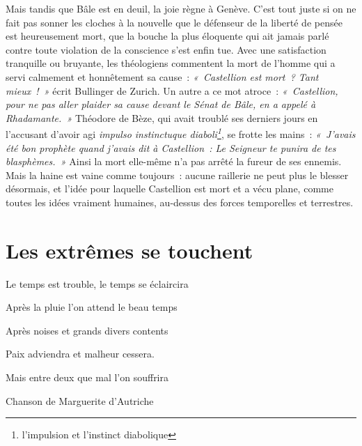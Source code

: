 \documentclass[french,twoside]{book} %
\newcommand\foreign[1]{\emph{#1}}
\newcommand{\bibl}[1]{{\smallskip\RaggedLeft\normalsize\normalfont #1\par\medskip}}
\newcommand{\spl}[1]{\noindent\hangindent=2\parindent  #1\par} %
\newenvironment{epigraph}{\begin{addmargin}[2\parindent]{0em}\sffamily\large\setstretch{0.95}}{\end{addmargin}\bigskip}
\newcommand\chapteropen{} %
\newcommand\chapterclose{} %
\begin{document}
\noindent Mais tandis que Bâle est en deuil, la joie règne à Genève. C’est tout juste si on ne fait pas sonner les cloches à la nouvelle que le défenseur de la liberté de pensée est heureusement mort, que la bouche la plus éloquente qui ait jamais parlé contre toute violation de la conscience s’est enfin tue. Avec une satisfaction tranquille ou bruyante, les théologiens commentent la mort de l’homme qui a servi calmement et honnêtement sa cause : \emph{« Castellion est mort ? Tant mieux ! »} écrit Bullinger de Zurich. Un autre a ce mot atroce : \emph{« Castellion, pour ne pas aller plaider sa cause devant le Sénat de Bâle, en a appelé à Rhadamante. »} Théodore de Bèze, qui avait troublé ses derniers jours en l’accusant d’avoir agi \foreign{impulso instinctuque diaboli\footnote{l’impulsion et l’instinct diabolique}}, se frotte les mains : \emph{« J’avais été bon prophète quand j’avais dit à Castellion : Le Seigneur te punira de tes blasphèmes. »} Ainsi la mort elle-même n’a pas arrêté la fureur de ses ennemis. Mais la haine est vaine comme toujours : aucune raillerie ne peut plus le blesser désormais, et l’idée pour laquelle Castellion est mort et a vécu plane, comme toutes les idées vraiment humaines, au-dessus des forces temporelles et terrestres.
\chapterclose


\chapteropen

\chapter[{Les extrêmes se touchent}]{Les extrêmes se touchent}
\renewcommand{\leftmark}{Les extrêmes se touchent}


\begin{epigraph}
\spl{Le temps est trouble, le temps se éclaircira}
\spl{Après la pluie l’on attend le beau temps}
\spl{Après noises et grands divers contents}
\spl{}
\spl{Paix adviendra et malheur cessera.}
\spl{Mais entre deux que mal l’on souffrira}

\bibl{Chanson de Marguerite d’Autriche}
\end{epigraph}
\end{document}
